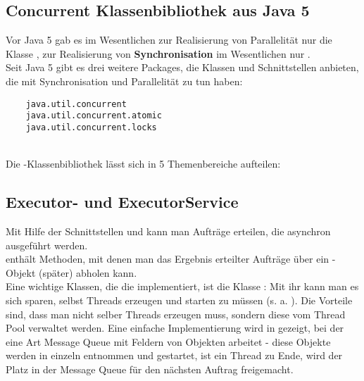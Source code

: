 \subsection{Concurrent Klassenbibliothek aus Java 5}

Vor Java 5 gab es im Wesentlichen zur Realisierung von Parallelität nur die Klasse , zur Realisierung von \textbf{Synchronisation} im Wesentlichen nur .\\

\noindent
Seit Java 5 gibt es drei weitere Packages, die Klassen und Schnittstellen anbieten, die mit Synchronisation und Parallelität zu tun haben:



\begin{verbatim}
    java.util.concurrent
    java.util.concurrent.atomic
    java.util.concurrent.locks
\end{verbatim}\\

\noindent
Die -Klassenbibliothek lässt sich in 5 Themenbereiche aufteilen:

\subsection*{Executor- und ExecutorService}
Mit Hilfe der Schnittstellen  und  kann man Aufträge erteilen, die asynchron ausgeführt werden.\\

\noindent
{} enthält Methoden, mit denen man das Ergebnis erteilter Aufträge über ein -Objekt (später) abholen kann.\\

\noindent
Eine wichtige Klassen, die die  implementiert, ist die Klasse :
Mit ihr kann man es sich sparen, selbst Threads erzeugen und starten zu müssen (s. a. \cite[146]{Oec22}).
Die Vorteile sind, dass man nicht selber Threads erzeugen muss, sondern diese vom Thread Pool verwaltet werden.
Eine einfache Implementierung wird in \cite[144]{Oec22} gezeigt, bei der eine Art Message Queue mit Feldern von 
Objekten arbeitet - diese Objekte werden in einzeln entnommen und gestartet, ist ein Thread zu Ende, wird der Platz in der
Message Queue für den nächsten Auftrag freigemacht.
\\

